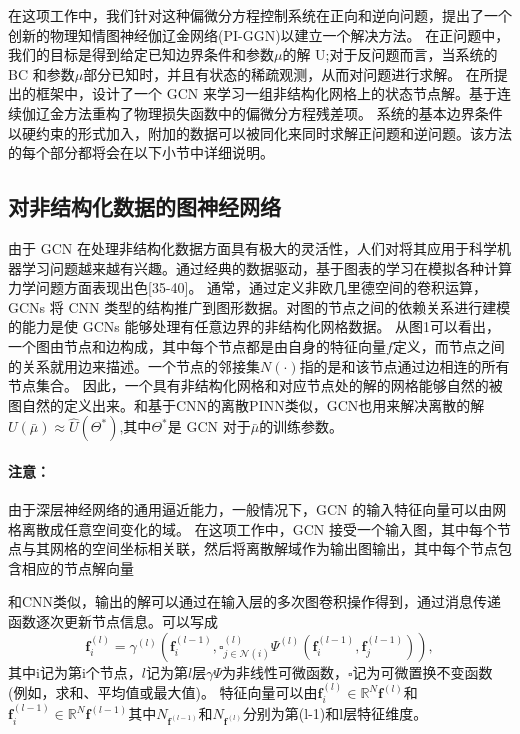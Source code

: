 在这项工作中，我们针对这种偏微分方程控制系统在正向和逆向问题，提出了一个创新的物理知情图神经伽辽金网络(PI-GGN)以建立一个解决方法。
在正问题中，我们的目标是得到给定已知边界条件和参数$\mu$的解 U;对于反问题而言，当系统的 BC 和参数$\mu$部分已知时，并且有状态的稀疏观测，从而对问题进行求解。
在所提出的框架中，设计了一个 GCN 来学习一组非结构化网格上的状态节点解。基于连续伽辽金方法重构了物理损失函数中的偏微分方程残差项。
系统的基本边界条件以硬约束的形式加入，附加的数据可以被同化来同时求解正问题和逆问题。该方法的每个部分都将会在以下小节中详细说明。
\subsection{对非结构化数据的图神经网络}
由于 GCN 在处理非结构化数据方面具有极大的灵活性，人们对将其应用于科学机器学习问题越来越有兴趣。通过经典的数据驱动，基于图表的学习在模拟各种计算力学问题方面表现出色[35-40]。
通常，通过定义非欧几里德空间的卷积运算，GCNs 将 CNN 类型的结构推广到图形数据。对图的节点之间的依赖关系进行建模的能力是使 GCNs 能够处理有任意边界的非结构化网格数据。
从图1可以看出，一个图由节点和边构成，其中每个节点都是由自身的特征向量$f$定义，而节点之间的关系就用边来描述。一个节点的邻接集$N(\cdot)$指的是和该节点通过边相连的所有节点集合。
因此，一个具有非结构化网格和对应节点处的解的网格能够自然的被图自然的定义出来。和基于CNN的离散PINN类似，GCN也用来解决离散的解$U(\bar{\mu})\approx \hat{U}(\Theta^*)$,其中$\Theta^*$是 GCN 对于$\bar{\mu}$的训练参数。

\paragraph*{注意：}由于深层神经网络的通用逼近能力，一般情况下，GCN 的输入特征向量可以由网格离散成任意空间变化的域。
在这项工作中，GCN 接受一个输入图，其中每个节点与其网格的空间坐标相关联，然后将离散解域作为输出图输出，其中每个节点包含相应的节点解向量


和CNN类似，输出的解可以通过在输入层的多次图卷积操作得到，通过消息传递函数逐次更新节点信息。可以写成
$$\boldsymbol{f}_{i}^{(l)}=\gamma^{(l)}\left(\boldsymbol{f}_{i}^{(l-1)}, \square_{j \in \mathcal{N}(i)}^{(l)} \Psi^{(l)}\left(\boldsymbol{f}_{i}^{(l-1)}, \boldsymbol{f}_{j}^{(l-1)}\right)\right),$$
其中i记为第i个节点，$l$记为第$l$层$\gamma\Psi$为非线性可微函数，$\square$记为可微置换不变函数(例如，求和、平均值或最大值)。
特征向量可以由$\boldsymbol{f}_{i}^{(l)} \in \mathbb{R}^{N} \boldsymbol{f}^{(l)} $和$ \boldsymbol{f}_{i}^{(l-1)} \in \mathbb{R}^{N} \boldsymbol{f}^{(l-1)}$其中$ N_{\boldsymbol{f}^{(l-1)}}$和$ N_{\boldsymbol{f}^{(l)}}$分别为第(l-1)和l层特征维度。

